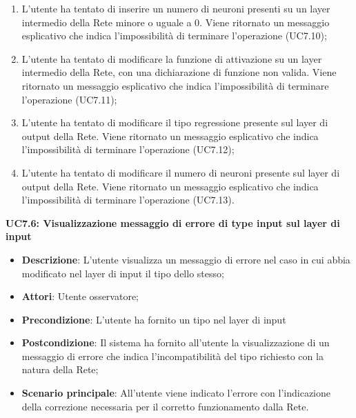 \begin{itemize}
\begin{enumerate}
\item L'utente ha tentato di inserire un numero di neuroni presenti su un layer intermedio della Rete minore o uguale a 0. Viene ritornato un messaggio esplicativo che indica l'impossibilit\`a di terminare l'operazione (UC7.10);
\item L'utente ha tentato di modificare la funzione di attivazione su un layer intermedio della Rete, con una dichiarazione di funzione non valida. Viene ritornato un messaggio esplicativo che indica l'impossibilit\`a di terminare l'operazione (UC7.11);
\item L'utente ha tentato di modificare il tipo regressione presente sul layer di output della Rete. Viene ritornato un messaggio esplicativo che indica l'impossibilit\`a di terminare l'operazione (UC7.12);
\item L'utente ha tentato di modificare il numero di neuroni presente sul layer di output della Rete. Viene ritornato un messaggio esplicativo che indica l'impossibilit\`a di terminare l'operazione (UC7.13).
\end{enumerate}
\end{itemize}

\textbf{UC7.6: Visualizzazione messaggio di errore di type input sul layer di input}\mbox{}
\label{UC7.6: Visualizzazione messaggio di errore di type input sul layer di input}
\noindent
\begin{itemize}
\item \textbf{Descrizione}: L'utente visualizza un messaggio di errore nel caso in cui abbia modificato nel layer di input il tipo dello stesso;
\item \textbf{Attori}: Utente osservatore;
\item \textbf{Precondizione}: L'utente ha fornito un tipo nel layer di input
\item \textbf{Postcondizione}: Il sistema ha fornito all'utente la visualizzazione di un messaggio di errore che indica l'incompatibilit\`a del tipo richiesto con la natura della Rete;
\item \textbf{Scenario principale}: All'utente viene indicato l'errore con l'indicazione della correzione necessaria per il corretto funzionamento dalla Rete.
\end{itemize}


